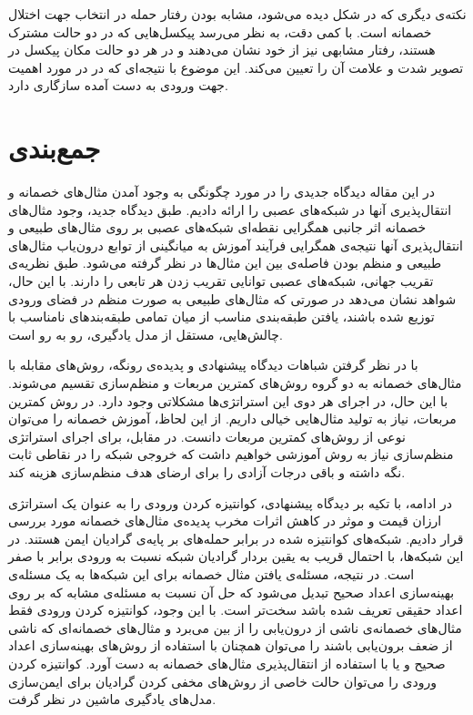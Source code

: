 \documentclass[12pt,onecolumn,a4paper]{article}
\begin{document}
نکته‌ی دیگری که در شکل دیده می‌شود، مشابه بودن رفتار حمله در انتخاب جهت اختلال خصمانه است. با کمی دقت، به نظر می‌رسد پیکسل‌هایی که در دو حالت مشترک هستند، رفتار مشابهی نیز از خود نشان می‌دهند و در هر دو حالت مکان پیکسل در تصویر  شدت و علامت آن را تعیین می‌کند. این موضوع با نتیجه‌ای که در \cite{goodfellow2014explaining} در مورد اهمیت جهت ورودی به دست آمده سازگاری دارد.

\section{جمع‌بندی}
در این مقاله دیدگاه جدیدی را در مورد چگونگی به وجود آمدن مثال‌های خصمانه و انتقال‌پذیری آنها در شبکه‌های عصبی را ارائه دادیم. طبق دیدگاه جدید، وجود مثال‌های خصمانه اثر جانبی همگرایی نقطه‌ای شبکه‌های عصبی بر روی مثال‌های طبیعی و انتقال‌پذیری آنها نتیجه‌ی همگرایی فرآیند آموزش به میانگینی از توابع درون‌یاب مثال‌های طبیعی و منظم بودن فاصله‌ی بین این مثال‌ها در نظر گرفته می‌شود. طبق نظریه‌ی تقریب جهانی، شبکه‌های عصبی توانایی تقریب زدن هر تابعی را دارند. با این حال، شواهد نشان می‌دهد در صورتی که مثال‌های طبیعی به صورت منظم در فضای ورودی توزیع شده باشند، یافتن طبقه‌بندی مناسب از میان تمامی طبقه‌بندهای نامناسب با چالش‌هایی، مستقل از مدل یادگیری، رو به رو است.

با در نظر گرفتن شباهات دیدگاه پیشنهادی و پدیده‌ی رونگه، روش‌های مقابله با مثال‌های خصمانه به دو گروه روش‌های کمترین مربعات و منظم‌سازی تقسیم می‌شوند. با این حال، در اجرای هر دوی این استراتژی‌ها مشکلاتی وجود دارد. در روش کمترین مربعات، نیاز به تولید مثال‌هایی خیالی داریم. از این لحاظ، آموزش خصمانه را می‌توان نوعی از روش‌های کمترین مربعات دانست. در مقابل، برای اجرای استراتژی منظم‌سازی نیاز به روش آموزشی خواهیم داشت که خروجی شبکه را در نقاطی ثابت نگه داشته و باقی درجات آزادی را برای ارضای هدف منظم‌سازی هزینه کند.

در ادامه، با تکیه بر دیدگاه پیشنهادی، کوانتیزه کردن ورودی را به عنوان یک استراتژی ارزان قیمت و موثر در کاهش اثرات مخرب پدیده‌ی مثال‌های خصمانه مورد بررسی قرار دادیم. شبکه‌های کوانتیزه شده در برابر حمله‌های بر پایه‌ی گرادیان ایمن هستند. در این شبکه‌ها، با احتمال قریب به یقین بردار گرادیان شبکه نسبت به ورودی برابر با صفر است. در نتیجه، مسئله‌ی یافتن مثال خصمانه برای این شبکه‌ها به یک مسئله‌ی بهینه‌سازی اعداد صحیح تبدیل می‌شود که حل آن نسبت به مسئله‌ی مشابه که بر روی اعداد حقیقی تعریف شده باشد سخت‌تر است. با این وجود، کوانتیزه کردن ورودی فقط مثال‌های خصمانه‌ی ناشی از درون‌یابی را از بین می‌برد و مثال‌های خصمانه‌ای که ناشی از ضعف برون‌یابی باشند را می‌توان همچنان با استفاده از روش‌های بهینه‌سازی اعداد صحیح و یا با استفاده از انتقال‌پذیری مثال‌های خصمانه به دست آورد. کوانتیزه کردن ورودی را می‌توان حالت خاصی از روش‌های مخفی کردن گرادیان برای ایمن‌سازی مدل‌های یادگیری ماشین در نظر گرفت.
\end{document}
